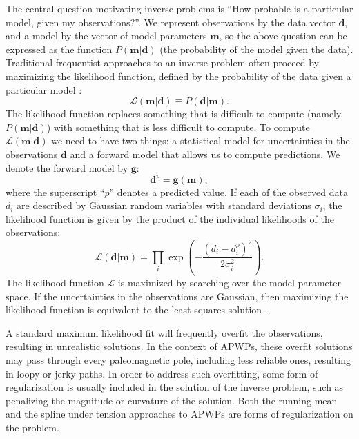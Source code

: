 \documentclass[11pt,letterpaper]{article}
\begin{document}
The central question motivating inverse problems is ``How probable is a particular model, given my observations?''. We represent observations by the data vector $\mathbf{d}$, and a model by the vector of model parameters $\mathbf{m}$, so the above question can be expressed as the function $P(\mathbf{m} \vert \mathbf{d})$ (the probability of the model given the data). Traditional frequentist approaches to an inverse problem often proceed by maximizing the likelihood function, defined by the probability of the data given a particular model \citep[e.g.][]{Aster2005a}:
\begin{equation}
\mathcal{L} ( \mathbf{m} \vert \mathbf{d} ) \equiv P( \mathbf{d} \vert \mathbf{m} ).
\label{eq:likelihood}
\end{equation}
The likelihood function replaces something that is difficult to compute (namely, $P(\mathbf{m} \vert \mathbf{d})$)
with something that is less difficult to compute. 
To compute $\mathcal{L}(\mathbf{m} \vert \mathbf{d})$ we need to have two things: a statistical model for 
uncertainties in the observations $\mathbf{d}$ and a forward model that allows us to compute
predictions. We denote the forward model by $\mathbf{g}$:
\begin{equation}
\mathbf{d}^p = \mathbf{g}(\mathbf{m}),
\label{eq:forward}
\end{equation}
where the superscript ``$p$'' denotes a predicted value.
If each of the observed data $d_i$ are described by Gaussian random variables with standard deviations $\sigma_i$, the likelihood function is given by the product of the individual likelihoods of the observations:
\begin{equation}
\mathcal{L}(\mathbf{d} | \mathbf{m} ) = \displaystyle\prod_i \exp\left({-\frac{(d_i - d_{i}^p)^2}{2 \sigma_i^2}}\right).
\label{eq:example_likelihood}
\end{equation}
The likelihood function $\mathcal{L}$ is maximized by searching over the model parameter space.
If the uncertainties in the observations are Gaussian, then maximizing the likelihood function is
equivalent to the least squares solution \citep{Aster2005a}.

A standard maximum likelihood fit will frequently overfit the observations, resulting in unrealistic solutions. In the context of APWPs, these overfit solutions may pass through every paleomagnetic pole, including less reliable ones, resulting in loopy or jerky paths. In order to address such overfitting, some form of regularization is usually included in the solution of the inverse problem, such as penalizing the magnitude or curvature of the solution. Both the running-mean and the spline under tension approaches to APWPs are forms of regularization on the problem.
\end{document}
